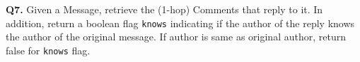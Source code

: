 \textbf{Q7.}
Given a Message, retrieve the (1-hop) Comments that reply to it.
In addition, return a boolean flag \texttt{knows} indicating if the
author of the reply knows the author of the original message. If author
is same as original author, return false for \texttt{knows} flag.
